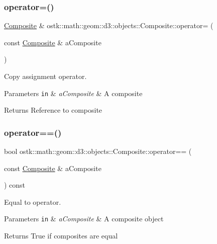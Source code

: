\subsubsection{\texorpdfstring{operator=()}{operator=()}}
{\footnotesize\ttfamily \hyperlink{classostk_1_1math_1_1geom_1_1d3_1_1objects_1_1_composite}{Composite} \& ostk\+::math\+::geom\+::d3\+::objects\+::\+Composite\+::operator= (\begin{DoxyParamCaption}\item[{const \hyperlink{classostk_1_1math_1_1geom_1_1d3_1_1objects_1_1_composite}{Composite} \&}]{a\+Composite }\end{DoxyParamCaption})}



Copy assignment operator. 


\begin{DoxyParams}[1]{Parameters}
\mbox{\tt in}  & {\em a\+Composite} & A composite \\
\hline
\end{DoxyParams}
\begin{DoxyReturn}{Returns}
Reference to composite 
\end{DoxyReturn}
\mbox{\label{classostk_1_1math_1_1geom_1_1d3_1_1objects_1_1_composite_aa41f70a711077a4b59937fddef380150}} 
\subsubsection{\texorpdfstring{operator==()}{operator==()}}
{\footnotesize\ttfamily bool ostk\+::math\+::geom\+::d3\+::objects\+::\+Composite\+::operator== (\begin{DoxyParamCaption}\item[{const \hyperlink{classostk_1_1math_1_1geom_1_1d3_1_1objects_1_1_composite}{Composite} \&}]{a\+Composite }\end{DoxyParamCaption}) const}



Equal to operator. 


\begin{DoxyParams}[1]{Parameters}
\mbox{\tt in}  & {\em a\+Composite} & A composite object \\
\hline
\end{DoxyParams}
\begin{DoxyReturn}{Returns}
True if composites are equal 
\end{DoxyReturn}
\mbox{\label{classostk_1_1math_1_1geom_1_1d3_1_1objects_1_1_composite_afa4ff037d2ab625c650ef0e45c6ea4e6}} 
